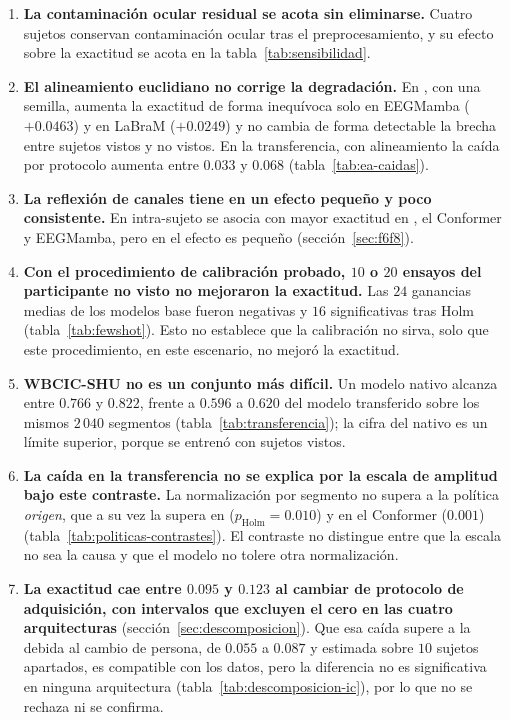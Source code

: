 \begin{enumerate}
        señal. En $21$ de los $22$ contrastes el signo coincide con el del cambio en la proporción de
        particiones que se detienen en el suelo del esquema, explicación alternativa que el diseño no separa.
  \item \textbf{La contaminación ocular residual se acota sin eliminarse.} Cuatro sujetos conservan
        contaminación ocular tras el preprocesamiento, y su efecto sobre la exactitud se acota en la
        tabla~\ref{tab:sensibilidad}.
  \item \textbf{El alineamiento euclidiano no corrige la degradación.} En \loso{}, con una semilla,
        aumenta la exactitud de forma inequívoca solo en EEGMamba ($+0.0463$) y en LaBraM ($+0.0249$) y no
        cambia de forma detectable la brecha entre sujetos vistos y no vistos. En la transferencia, con alineamiento
        la caída por protocolo aumenta entre $0.033$ y $0.068$ (tabla~\ref{tab:ea-caidas}).
  \item \textbf{La reflexión de canales tiene en \loso{} un efecto pequeño y poco consistente.} En
        intra-sujeto se asocia con mayor exactitud en \eegnet{}, el Conformer y EEGMamba, pero en \loso{} el
        efecto es pequeño (sección~\ref{sec:f6f8}).
  \item \textbf{Con el procedimiento de calibración probado, $10$ o $20$ ensayos del participante no visto
        no mejoraron la exactitud.} Las $24$ ganancias medias de los modelos base fueron negativas y $16$
        significativas tras Holm (tabla~\ref{tab:fewshot}). Esto no establece que la calibración no sirva,
        solo que este procedimiento, en este escenario, no mejoró la exactitud.
  \item \textbf{WBCIC-SHU no es un conjunto más difícil.} Un modelo nativo alcanza entre $0.766$ y
        $0.822$, frente a $0.596$ a $0.620$ del modelo transferido sobre los mismos $2\,040$ segmentos
        (tabla~\ref{tab:transferencia}); la cifra del nativo es un límite superior, porque se entrenó con
        sujetos vistos.
  \item \textbf{La caída en la transferencia no se explica por la escala de amplitud bajo este contraste.}
        La normalización por segmento no supera a la política \emph{origen}, que a su vez la supera en
        \eegnet{} ($p_{\text{Holm}} = 0.010$) y en el Conformer ($0.001$)
        (tabla~\ref{tab:politicas-contrastes}). El contraste no distingue entre que la escala no sea la causa
        y que el modelo no tolere otra normalización.
  \item \textbf{La exactitud cae entre $0.095$ y $0.123$ al cambiar de protocolo de adquisición, con
        intervalos que excluyen el cero en las cuatro arquitecturas} (sección~\ref{sec:descomposicion}).
        Que esa caída supere a la debida al cambio de persona, de $0.055$ a $0.087$ y estimada sobre $10$
        sujetos apartados, es compatible con los datos, pero la diferencia no es significativa en ninguna
        arquitectura (tabla~\ref{tab:descomposicion-ic}), por lo que no se rechaza ni se confirma.
\end{enumerate}

